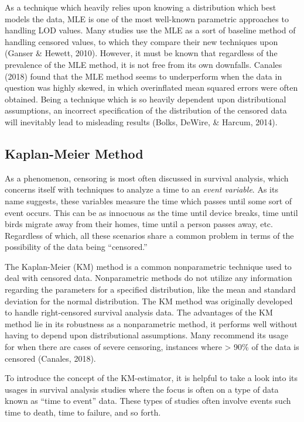 \documentclass[12pt, twoside]{amherstthesis}
\begin{document}
As a technique which heavily relies upon knowing a distribution which best models the data, MLE is one of the most well-known parametric approaches to handling LOD values. Many studies use the MLE as a sort of baseline method of handling censored values, to which they compare their new techniques upon (Ganser \& Hewett, 2010). However, it must be known that regardless of the prevalence of the MLE method, it is not free from its own downfalls. Canales (2018) found that the MLE method seems to underperform when the data in question was highly skewed, in which overinflated mean squared errors were often obtained. Being a technique which is so heavily dependent upon distributional assumptions, an incorrect specification of the distribution of the censored data will inevitably lead to misleading results (Bolks, DeWire, \& Harcum, 2014).

\hypertarget{rkm}{%
\subsection{Kaplan-Meier Method}\label{rkm}}

As a phenomenon, censoring is most often discussed in survival analysis, which concerns itself with techniques to analyze a time to an \emph{event variable}. As its name suggests, these variables measure the time which passes until some sort of event occurs. This can be as innocuous as the time until device breaks, time until birds migrate away from their homes, time until a person passes away, etc. Regardless of which, all these scenarios share a common problem in terms of the possibility of the data being ``censored.''

The Kaplan-Meier (KM) method is a common nonparametric technique used to deal with censored data. Nonparametric methods do not utilize any information regarding the parameters for a specified distribution, like the mean and standard deviation for the normal distribution. The KM method was originally developed to handle right-censored survival analysis data. The advantages of the KM method lie in its robustness as a nonparametric method, it performs well without having to depend upon distributional assumptions. Many recommend its usage for when there are cases of severe censoring, instances where \textgreater{} 90\% of the data is censored (Canales, 2018).

To introduce the concept of the KM-estimator, it is helpful to take a look into its usages in survival analysis studies where the focus is often on a type of data known as ``time to event'' data. These types of studies often involve events such time to death, time to failure, and so forth.
\end{document}
